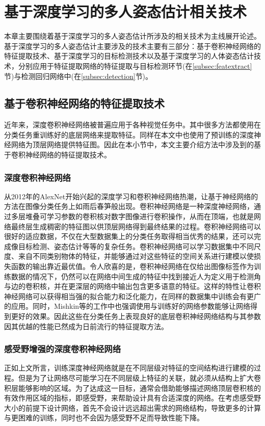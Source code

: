 \chapter{基于深度学习的多人姿态估计相关技术}
\label{cha:basicfacts}
本章主要围绕着基于深度学习的多人姿态估计所涉及的相关技术为主线展开论述。基于深度学习的多人姿态估计主要涉及的技术主要有三部分：基于卷积神经网络的特征提取技术、基于深度学习的目标检测技术以及基于深度学习的人体姿态估计技术，分别应用于特征提取网络的特征提取与目标检测环节(在\ref{subsec:featextract}节)与检测回归网络中(在\ref{subsec:detection}节)。
\section{基于卷积神经网络的特征提取技术}
近年来，深度卷积神经网络被普遍应用于各种视觉任务中。其中很多方法都使用在分类任务重训练好的底层网络来提取特征。同样在本文中也使用了预训练的深度神经网络为顶层网络提供特征图。因此在本小节中，本文主要介绍方法中涉及到的基于卷积神经网络的特征提取技术。
\subsection{深度卷积神经网络}
\label{subsec:factsfeature}
从2012年的AlexNet\cite{alex2012alexnet}开始兴起的深度学习和卷积神经网络热潮，让基于神经网络的方法在图像分类任务上如雨后春笋般出现。卷积神经网络是一种深度神经网络，通过多层堆叠可学习参数的卷积核对数字图像进行卷积操作，从而在顶端，也就是网络最终层生成稠密的特征图以供顶层网络得到最终结果的过程。卷积神经网络可以很好的适应数据，不仅在大型数据集上的分类任务取得相当优秀的结果\cite{simonyan2014very}，还可以完成像目标检测、姿态估计等等的复杂任务。卷积神经网络可以学习数据集中不同尺度、来自不同类别物体的特征，并能够通过对这些特征的空间关系进行建模以使损失函数的输出靠近最优值。令人欣喜的是，卷积神经网络在仅给出图像标签作为训练数据的情况下，仍然可以在网络中间生成的特征中找到接近人为定义用于检测角与边的卷积核，并在更深层的网络中输出包含更多语意的特征\cite{yosinski2015understanding}。这样的特性让卷积神经网络可以获得相当强的拟合能力和泛化能力，在同样的数据集中训练会有更广的应用。同时，Mishkin等的工作中\cite{mishkin2015all}也强调使用与训练好的网络参数能够让网络得到更好的效果。因此这些在分类任务上表现良好的底层卷积神经网络结构与其参数因其优越的性能已然成为日前流行的特征提取方法。
\subsection{感受野增强的深度卷积神经网络}
\label{subsec:factsdeepextract}
正如上文所言，训练深度神经网络就是在不同层级对特征的空间结构进行建模的过程。但是为了让网络尽可能学习在不同层级上特征的关联，就必须从结构上扩大卷积层能够影响的区域。为了达成这一目标，通常会借助能够描述网络顶层卷积核的有效作用区域的指标，即感受野，来帮助设计具有合适深度的网络。在考虑感受野大小的前提下设计网络，首先不会设计远远超出需求的网络结构，导致更多的计算与更困难的训练，同时也不会因为感受野不足而导致性能下降。

